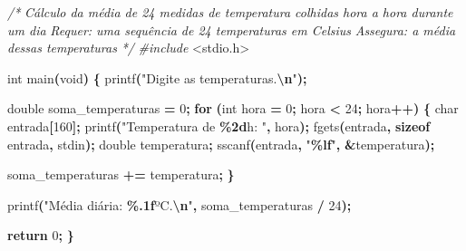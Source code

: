 \documentclass[
  11pt,
  a4paper,
]{scrbook}
\newenvironment{Shaded}{\begin{snugshade}}{\end{snugshade}}
\newcommand{\CommentTok}[1]{\textcolor[rgb]{0.56,0.35,0.01}{\textit{#1}}}
\newcommand{\ControlFlowTok}[1]{\textcolor[rgb]{0.13,0.29,0.53}{\textbf{#1}}}
\newcommand{\DataTypeTok}[1]{\textcolor[rgb]{0.13,0.29,0.53}{#1}}
\newcommand{\DecValTok}[1]{\textcolor[rgb]{0.00,0.00,0.81}{#1}}
\newcommand{\ImportTok}[1]{#1}
\newcommand{\KeywordTok}[1]{\textcolor[rgb]{0.13,0.29,0.53}{\textbf{#1}}}
\newcommand{\NormalTok}[1]{#1}
\newcommand{\OperatorTok}[1]{\textcolor[rgb]{0.81,0.36,0.00}{\textbf{#1}}}
\newcommand{\PreprocessorTok}[1]{\textcolor[rgb]{0.56,0.35,0.01}{\textit{#1}}}
\newcommand{\SpecialCharTok}[1]{\textcolor[rgb]{0.81,0.36,0.00}{\textbf{#1}}}
\newcommand{\StringTok}[1]{\textcolor[rgb]{0.31,0.60,0.02}{#1}}
\begin{document}
\begin{Shaded}
\begin{Highlighting}[]
\CommentTok{/*}
\CommentTok{Cálculo da média de 24 medidas de temperatura colhidas hora a hora durante um dia}
\CommentTok{Requer: uma sequência de 24 temperaturas em Celsius}
\CommentTok{Assegura: a média dessas temperaturas}
\CommentTok{*/}
\PreprocessorTok{\#include }\ImportTok{\textless{}stdio.h\textgreater{}}

\DataTypeTok{int}\NormalTok{ main}\OperatorTok{(}\DataTypeTok{void}\OperatorTok{)} \OperatorTok{\{}
\NormalTok{    printf}\OperatorTok{(}\StringTok{"Digite as temperaturas.}\SpecialCharTok{\textbackslash{}n}\StringTok{"}\OperatorTok{);}

    \DataTypeTok{double}\NormalTok{ soma\_temperaturas }\OperatorTok{=} \DecValTok{0}\OperatorTok{;}
    \ControlFlowTok{for} \OperatorTok{(}\DataTypeTok{int}\NormalTok{ hora }\OperatorTok{=} \DecValTok{0}\OperatorTok{;}\NormalTok{ hora }\OperatorTok{\textless{}} \DecValTok{24}\OperatorTok{;}\NormalTok{ hora}\OperatorTok{++)} \OperatorTok{\{}
        \DataTypeTok{char}\NormalTok{ entrada}\OperatorTok{[}\DecValTok{160}\OperatorTok{];}
\NormalTok{        printf}\OperatorTok{(}\StringTok{"Temperatura de }\SpecialCharTok{\%2d}\StringTok{h: "}\OperatorTok{,}\NormalTok{ hora}\OperatorTok{);}
\NormalTok{        fgets}\OperatorTok{(}\NormalTok{entrada}\OperatorTok{,} \KeywordTok{sizeof}\NormalTok{ entrada}\OperatorTok{,}\NormalTok{ stdin}\OperatorTok{);}
        \DataTypeTok{double}\NormalTok{ temperatura}\OperatorTok{;}
\NormalTok{        sscanf}\OperatorTok{(}\NormalTok{entrada}\OperatorTok{,} \StringTok{"}\SpecialCharTok{\%lf}\StringTok{"}\OperatorTok{,} \OperatorTok{\&}\NormalTok{temperatura}\OperatorTok{);}

\NormalTok{        soma\_temperaturas }\OperatorTok{+=}\NormalTok{ temperatura}\OperatorTok{;}
    \OperatorTok{\}}

\NormalTok{    printf}\OperatorTok{(}\StringTok{"Média diária: }\SpecialCharTok{\%.1f}\StringTok{ºC.}\SpecialCharTok{\textbackslash{}n}\StringTok{"}\OperatorTok{,}\NormalTok{ soma\_temperaturas }\OperatorTok{/} \DecValTok{24}\OperatorTok{);}

    \ControlFlowTok{return} \DecValTok{0}\OperatorTok{;}
\OperatorTok{\}}
\end{Highlighting}
\end{Shaded}
\end{document}
